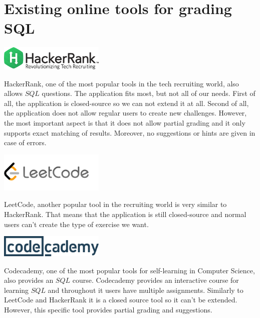 \newcommand{\cmark}{\ding{51}}%
\newcommand{\xmark}{\ding{55}}%
\section{Existing online tools for grading SQL}

\begin{center}
    \includegraphics[width=50mm,scale=0.5]{images/HackerRank.png}
\end{center}

HackerRank, one of the most popular tools in the tech recruiting world, also allows $SQL$ questions. The application fits most, but not all of our needs. First of all, the application is closed-source so we can not extend it at all. Second of all, the application does not allow regular users to create new challenges. However, the most important aspect is that it does not allow partial grading and it only supports exact matching of results. Moreover, no suggestions or hints are given in case of errors.

\begin{center}
    \includegraphics[width=50mm,scale=0.5]{images/LeetCode.png}
\end{center}

LeetCode, another popular tool in the recruiting world is very similar to HackerRank. That means that the application is still closed-source and normal users can't create the type of exercise we want.


\begin{center}
    \includegraphics[width=50mm,scale=0.5]{images/CodeCademy.png}
\end{center}

Codecademy, one of the most popular tools for self-learning in Computer Science, also provides an $SQL$ course. Codecademy provides an interactive course for learning $SQL$ and throughout it users have multiple assignments. Similarly to LeetCode and HackerRank it is a closed source tool so it can't be extended. However, this specific tool provides partial grading and suggestions.

